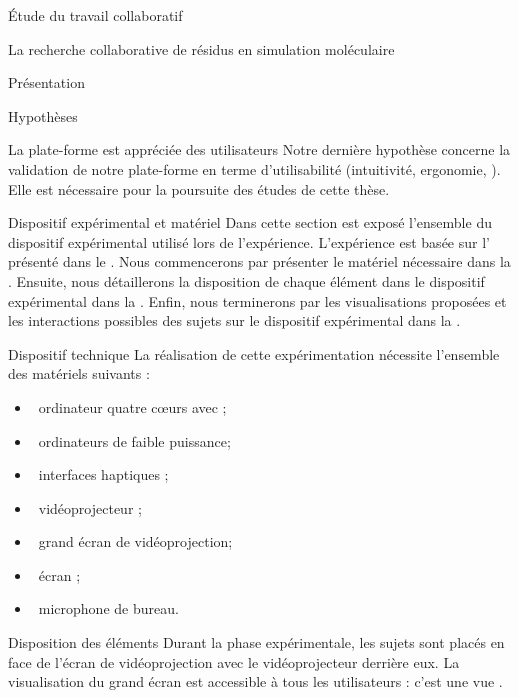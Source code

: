 \documentclass[myfrancais]{mythesis}
\begin{document}
\begin{mypart}{Étude du travail collaboratif}
\begin{mychapter}{La recherche collaborative de résidus en simulation moléculaire}
\begin{mysection}{Présentation}
\begin{mysubsection}{Hypothèses}
\begin{myparagraph}{ La plate-forme est appréciée des utilisateurs}
						Notre dernière hypothèse concerne la validation de notre plate-forme en terme d'utilisabilité (intuitivité, ergonomie, \myetc).
						Elle est nécessaire pour la poursuite des études de cette thèse.
					\end{myparagraph}
				\end{mysubsection}
			\end{mysection}
			\begin{mysection}{Dispositif expérimental et matériel}
				Dans cette section est exposé l'ensemble du dispositif expérimental utilisé lors de l'expérience.
				L'expérience est basée sur l' présenté dans le .
				Nous commencerons par présenter le matériel nécessaire dans la .
				Ensuite, nous détaillerons la disposition de chaque élément dans le dispositif expérimental dans la .
				Enfin, nous terminerons par les visualisations proposées et les interactions possibles des sujets sur le dispositif expérimental dans la .
				\begin{mysubsection}{Dispositif technique}
					La réalisation de cette expérimentation nécessite l'ensemble des matériels suivants :
					\begin{itemize}
						\item {}~ordinateur quatre cœurs \myIntelCore avec ;
						\item {}~ordinateurs de faible puissance;
						\item {}~interfaces haptiques \myOmni;
						\item {}~vidéoprojecteur ;
						\item {}~grand écran de vidéoprojection;
						\item {}~écran \myLCD {};
						\item {}~microphone de bureau.
					\end{itemize}
				\end{mysubsection}
				\begin{mysubsection}{Disposition des éléments}
					Durant la phase expérimentale, les sujets sont placés en face de l'écran de vidéoprojection avec le vidéoprojecteur derrière eux.
					La visualisation du grand écran est accessible à tous les utilisateurs : c'est une vue .

\end{mysubsection}
\end{mysection}
\end{mychapter}
\end{mypart}
\end{document}
